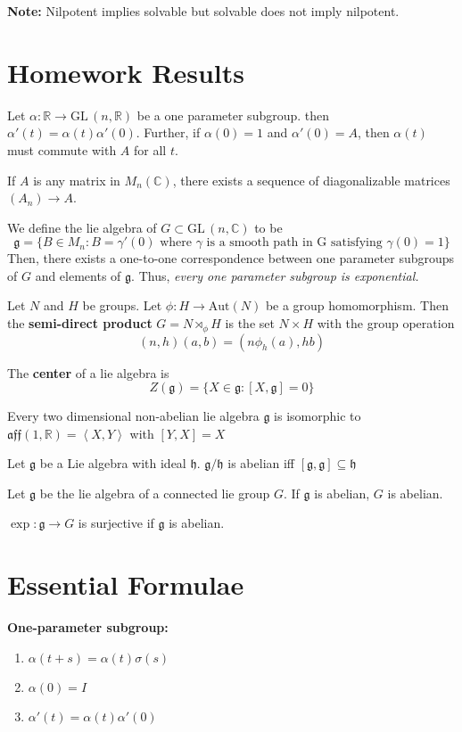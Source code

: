 \documentclass[12pt]{article}
\newcommand{\R}{\mathbb{R}}
\newcommand{\C}{\mathbb{C}}
\newcommand{\brak}[1]{\left\langle #1 \right\rangle}
\newcommand{\GL}{\text{GL}\,}
\newcommand{\g}{\mathfrak{g}}
\newcommand{\h}{\mathfrak{h}}
\newcommand{\Aut}{\text{Aut}}
\begin{document}
\textbf{Note:} Nilpotent implies solvable but solvable does not imply nilpotent. 

\pagebreak
\section{Homework Results}

Let $\alpha: \R \to \GL(n, \R)$ be a one parameter subgroup. then $\alpha'(t) = \alpha(t)\alpha'(0)$. Further, if $\alpha(0) = 1$ and $\alpha'(0) = A$, then $\alpha(t)$ must commute with $A$ for all $t$. 

If $A$ is any matrix in $M_n(\C)$, there exists a sequence of diagonalizable matrices $(A_n) \to A$. 

We define the lie algebra of $G \subset \GL(n, \C)$ to be  
\[\g = \{B \in M_n: B = \gamma'(0) \text{ where } \gamma \text{ is a smooth path in G satisfying } \gamma(0) = 1\}\]
Then, there exists a one-to-one correspondence between one parameter subgroups of $G$ and elements of $\g$. Thus, \emph{every one parameter subgroup is exponential.}

Let $N$ and $H$ be groups. Let $\phi: H \to \Aut(N)$ be a group homomorphism. Then the \textbf{semi-direct product} $G = N \rtimes_{\phi} H$ is the set $N \times H$ with the group operation 
\[(n, h)(a, b) = (n\phi_h(a), hb)\]

The \textbf{center} of a lie algebra is
\[Z(\g) = \{X \in \g: [X, \g] = 0\}\]

Every two dimensional non-abelian lie algebra $\g$ is isomorphic to $\mathfrak{aff}(1, \R) = \brak{X, Y}$ with $[Y, X] = X$

Let $\g$ be a Lie algebra with ideal $\h$. $\g/\h$ is abelian iff $[\g, \g] \subseteq \h$ 

Let $\g$ be the lie algebra of a connected lie group $G$. If $\g$ is abelian, $G$ is abelian. 

$\exp: \g \to G$ is surjective if $\g$ is abelian. 

\pagebreak
\section{Essential Formulae}

\textbf{One-parameter subgroup:}
\begin{enumerate}
    \item $\alpha(t + s) = \alpha(t)\sigma(s)$
    \item $\alpha(0) = I$
    \item $\alpha'(t) = \alpha(t)\alpha'(0)$
\end{enumerate}
\end{document}
